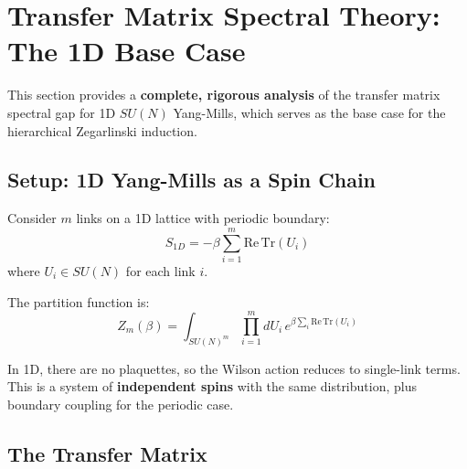 \section{Transfer Matrix Spectral Theory: The 1D Base Case}
\label{sec:transfer-matrix-spectral}

This section provides a \textbf{complete, rigorous analysis} of the transfer 
matrix spectral gap for 1D $SU(N)$ Yang-Mills, which serves as the base case 
for the hierarchical Zegarlinski induction.

\subsection{Setup: 1D Yang-Mills as a Spin Chain}

\begin{definition}
\label{def:1d-ym}
Consider $m$ links on a 1D lattice with periodic boundary:
\begin{equation}
S_{1D} = -\beta \sum_{i=1}^{m} \mathrm{Re}\,\mathrm{Tr}(U_i)
\end{equation}
where $U_i \in SU(N)$ for each link $i$.

The partition function is:
\begin{equation}
Z_m(\beta) = \int_{SU(N)^m} \prod_{i=1}^m dU_i \, e^{\beta \sum_i \mathrm{Re}\,\mathrm{Tr}(U_i)}
\end{equation}
\end{definition}

\begin{remark}[Simplification]
In 1D, there are no plaquettes, so the Wilson action reduces to single-link 
terms. This is a system of \textbf{independent spins} with the same distribution, 
plus boundary coupling for the periodic case.
\end{remark}

\subsection{The Transfer Matrix}

